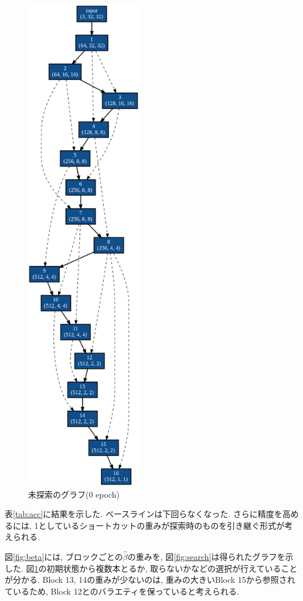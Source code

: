 \documentclass[twocolumn]{jarticle}     %
\begin{document}
\begin{figure}[tb]
	\begin{center}
		\includegraphics[clip,width=50mm]{graph_1.png}
		\caption{未探索のグラフ(0 epoch)}
		\label{fig:search_no}
	\end{center}
\end{figure}

表\ref{tab:acc}に結果を示した.
ベースラインは下回らなくなった.
さらに精度を高めるには, 1としているショートカットの重みが探索時のものを引き継ぐ形式が考えられる.

図\ref{fig:beta}には, ブロックごとの$\hat{\beta}$の重みを, 図\ref{fig:search}は得られたグラフを示した. 図\ref{fig:search_no}の初期状態から複数本とるか, 取らないかなどの選択が行えていることが分かる.
Block 13, 14の重みが少ないのは, 重みの大きいBlock 15から参照されているため, Block 12とのバラエティを保っていると考えられる.
\end{document}
